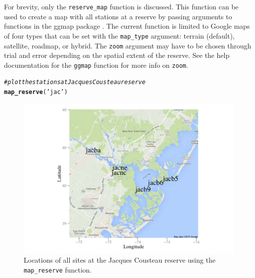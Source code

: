\documentclass[10pt,letterpaper]{article}\usepackage[]{graphicx}\usepackage[]{color}
\makeatletter
\def\maxwidth{ %
  \ifdim\Gin@nat@width>\linewidth
    \linewidth
  \else
    \Gin@nat@width
  \fi
}
\newcommand{\hlstr}[1]{\textcolor[rgb]{0.192,0.494,0.8}{#1}}%
\newcommand{\hlcom}[1]{\textcolor[rgb]{0.678,0.584,0.686}{\textit{#1}}}%
\newcommand{\hlstd}[1]{\textcolor[rgb]{0.345,0.345,0.345}{#1}}%
\newcommand{\hlkwd}[1]{\textcolor[rgb]{0.737,0.353,0.396}{\textbf{#1}}}%
\newenvironment{kframe}{%
 \def\at@end@of@kframe{}%
 \ifinner\ifhmode%
  \def\at@end@of@kframe{\end{minipage}}%
  \begin{minipage}{\columnwidth}%
 \fi\fi%
 \def\FrameCommand##1{\hskip\@totalleftmargin \hskip-\fboxsep
 \colorbox{shadecolor}{##1}\hskip-\fboxsep
     \hskip-\linewidth \hskip-\@totalleftmargin \hskip\columnwidth}%
 \MakeFramed {\advance\hsize-\width
   \@totalleftmargin\z@ \linewidth\hsize
   \@setminipage}}%
 {\par\unskip\endMakeFramed%
 \at@end@of@kframe}
\newenvironment{knitrout}{}{} %
\makeatother
\begin{document}
For brevity, only the \texttt{reserve\_map} function is discussed.  This function can be used to create a map with all stations at a reserve by passing arguments to functions in the ggmap package \cite{ggmap13}. The current function is limited to Google maps of four types that can be set with the \texttt{map\_type} argument: terrain (default), satellite, roadmap, or hybrid.  The \texttt{zoom} argument may have to be chosen through trial and error depending on the spatial extent of the reserve.  See the help documentation for the \texttt{ggmap} function for more info on \texttt{zoom}.

\begin{knitrout}
\color{fgcolor}\begin{kframe}
\begin{alltt}
\hlcom{# plot the stations at Jacques Cousteau reserve}
\hlkwd{map_reserve}\hlstd{(}\hlstr{'jac'}\hlstd{)}
\end{alltt}
\end{kframe}\begin{figure}[!ht]


{\centering \includegraphics[width=\maxwidth]{figure/map_ex} 

}

\caption[Locations of all sites at the Jacques Cousteau reserve using the \texttt{map\_reserve} function]{Locations of all sites at the Jacques Cousteau reserve using the \texttt{map\_reserve} function.\label{fig:map_ex}}
\end{figure}


\end{knitrout}
\end{document}
